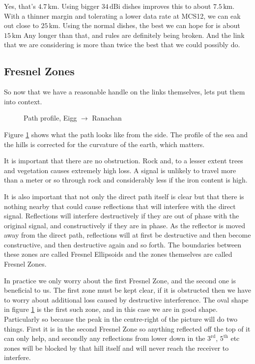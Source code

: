 Yes, that's $4.7\, \mathrm{km}$. Using bigger $34\, \mathrm{dBi}$
dishes improves this to about $7.5\, \mathrm{km}$. With a thinner
margin and tolerating a lower data rate at MCS12, we can eak out close
to $25\, \mathrm{km}$. Using the normal dishes, the best we can hope
for is about $15\, \mathrm{km}$ Any longer than that, and rules are
definitely being broken. And the link that we are considering is more
than twice the best that we could possibly do.

\subsection{Fresnel Zones}

So now that we have a reasonable handle on the links themselves, lets
put them into context.
\begin{figure}[ht]
  \begin{center}
    
    \caption{Path profile, Eigg $\rightarrow$ Ranachan}
    \label{fig:EIG_RAN_profile}
  \end{center}
\end{figure}
Figure \ref{fig:EIG_RAN_profile} shows what the path looks like from
the side. The profile of the sea and the hills is corrected for the
curvature of the earth, which matters.

It is important that there are no obstruction. Rock and, to a lesser
extent trees and vegetation causes extremely high loss. A signal is
unlikely to travel more than a meter or so through rock and
considerably less if the iron content is high.

It is also important that not only the direct path itself is clear but
that there is nothing nearby that could cause reflections that will
interfere with the direct signal. Reflections will interfere
destructively if they are out of phase with the original signal, and
constructively if they are in phase. As the reflector is moved away
from the direct path, reflections will at first be destructive and
then become constructive, and then destructive again and so forth. The
boundaries between these zones are called Fresnel Ellipsoids and the
zones themselves are called Fresnel Zones.

In practice we only worry about the first Fresnel Zone, and the second
one is beneficial to us. The first zone must be kept clear, if it is
obstructed then we have to worry about additional loss caused by
destructive interference. The oval shape in figure
\ref{fig:EIG_RAN_profile} is the first such zone, and in this case we
are in good shape. Particularly so because the peak in the
centre-right of the picture will do two things. First it is in the
second Fresnel Zone so anything reflected off the top of it can only
help, and secondly any reflections from lower down in the
$3^\mathrm{rd}$, $5^\mathrm{th}$ etc zones will be blocked by that
hill itself and will never reach the receiver to interfere.

